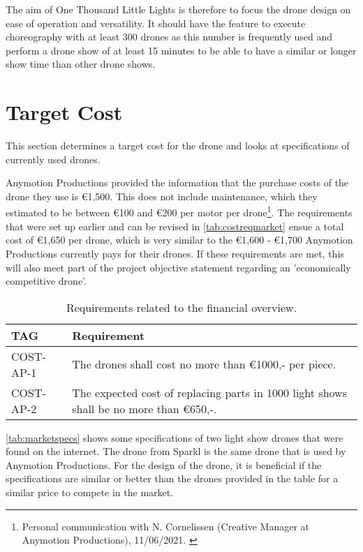 The aim of One Thousand Little Lights is therefore to focus the drone design on ease of operation and versatility. It should have the feature to execute choreography with at least 300 drones as this number is frequently used and perform a drone show of at least 15 minutes to be able to have a similar or longer show time than other drone shows.

\section{Target Cost}\label{sec:targetcost}
This section determines a target cost for the drone and looks at specifications of currently used drones. 

Anymotion Productions provided the information that the purchase costs of the drone they use is €1,500. This does not include maintenance, which they estimated to be between €100 and €200 per motor per drone\footnote{Personal communication with N. Cornelissen (Creative Manager at Anymotion Productions),  11/06/2021. \label{APemail}}. The requirements that were set up earlier and can be revised in 
\autoref{tab:costreqmarket} ensue a total cost of €1,650 per drone, which is very similar to the €1,600 - €1,700 Anymotion Productions currently pays for their drones. If these requirements are met, this will also meet part of the project objective statement regarding an 'economically competitive drone'. 

\begin{table}[h]
\centering
\caption{Requirements related to the financial overview.}
\label{tab:costreqmarket}
\begin{small}
\begin{tabular}{|l|l|}
\hline
\textbf{TAG} & \textbf{Requirement} \\ \hline
COST-AP-1 & The drones shall cost no more than €1000,- per piece. \\ \hline
COST-AP-2 & The expected cost of replacing parts in 1000 light shows shall be no more   than €650,-. \\ \hline
\end{tabular}
\end{small}
\end{table}


\autoref{tab:marketspecs} shows some specifications of two light show drones that were found on the internet. The drone from Sparkl is the same drone that is used by Anymotion Productions. For the design of the drone, it is beneficial if the specifications are similar or better than the drones provided in the table for a similar price to compete in the market.


